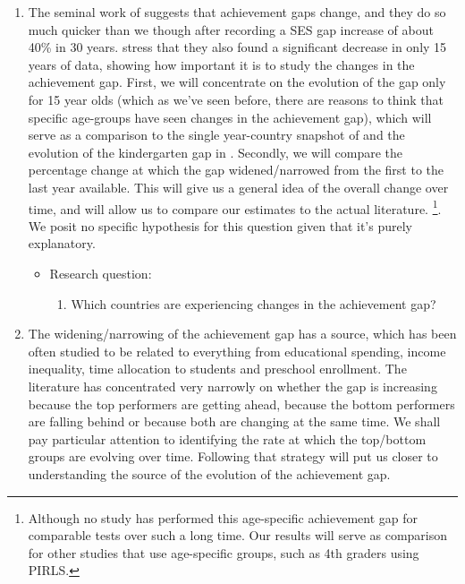 \begin{enumerate}

\item The seminal work of \citet{reardon2011} suggests that achievement gaps change, and they do so much quicker than we though after recording a SES gap increase of about 40\% in 30 years. \citet{reardon_portilla} stress that they also found a significant decrease in only 15 years of data, showing how important it is to study the changes in the achievement gap. First, we will concentrate on the evolution of the gap only for 15 year olds (which as we've seen before, there are reasons to think that specific age-groups have seen changes in the achievement gap), which will serve as a comparison to the single year-country snapshot of \citet{anna2016} and the evolution of the kindergarten gap in \citet{reardon_portilla}. Secondly, we will compare the percentage change at which the gap widened/narrowed from the first to the last year available. This will give us a general idea of the overall change over time, and will allow us to compare our estimates to the actual literature. \footnote{Although no study has performed this age-specific achievement gap for comparable tests over such a long time. Our results will serve as comparison for other studies that use age-specific groups, such as 4th graders using PIRLS.}. We posit no specific hypothesis for this question given that it's purely explanatory.

\begin{itemize}
\item Research question:
\begin{enumerate}

\item Which countries are experiencing changes in the achievement gap?

\end{enumerate}
\end{itemize}

\item The widening/narrowing of the achievement gap has a source, which has been often studied to be related to everything from educational spending, income inequality, time allocation to students and preschool enrollment. The literature has concentrated very narrowly on whether the gap is increasing because the top performers are getting ahead, because the bottom performers are falling behind or because both are changing at the same time. We shall pay particular attention to identifying the rate at which the top/bottom groups are evolving over time. Following that strategy will put us closer to understanding the source of the evolution of the achievement gap. 


\end{enumerate}
